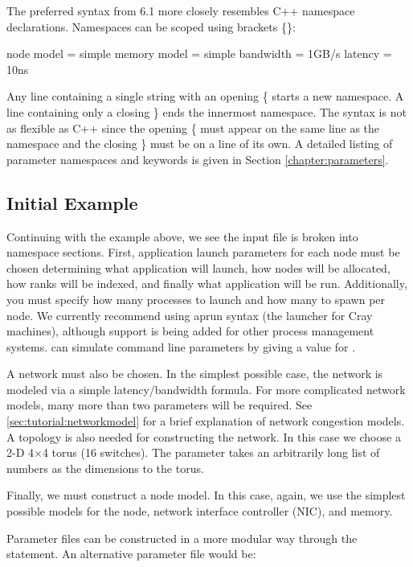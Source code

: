 The preferred syntax from 6.1 more closely resembles C++ namespace declarations. 
Namespaces can be scoped using brackets \{\}:

\begin{ViFile}
node {
 model = simple
 memory {
   model = simple
   bandwidth = 1GB/s
   latency = 10ns
 }
}
\end{ViFile}
Any line containing a single string with an opening \{ starts a new namespace.
A line containing only a closing \} ends the innermost namespace.
The syntax is not as flexible as C++ since the opening \{ must appear on the same line as the namespace and the closing \} must be on a line of its own.
A detailed listing of parameter namespaces and keywords is given in Section \ref{chapter:parameters}.

\subsection{Initial Example}
\label{subsec:initialExample}
Continuing with the example above, we see the input file is broken into namespace sections. 
First, application launch parameters for each node must be chosen determining what application will launch, 
how nodes will be allocated, how ranks will be indexed, and finally what application will be run.  
Additionally, you must specify how many processes to launch and how many to spawn per node.  
We currently recommend using aprun syntax (the launcher for Cray machines), 
although support is being added for other process management systems.
\sstmacro can simulate command line parameters by giving a value for .

A network must also be chosen.  
In the simplest possible case, the network is modeled via a simple latency/bandwidth formula.  
For more complicated network models, many more than two parameters will be required. 
See \ref{sec:tutorial:networkmodel} for a brief explanation of \sstmacro network congestion models. 
A topology is also needed for constructing the network.  
In this case we choose a 2-D 4$\times$4 torus (16 switches).  The  
parameter takes an arbitrarily long list of numbers as the dimensions to the torus.

Finally, we must construct a node model.  
In this case, again, we use the simplest possible models for the node, 
network interface controller (NIC), and memory.  

Parameter files can be constructed in a more modular way through the  statement.  
An alternative parameter file would be:

